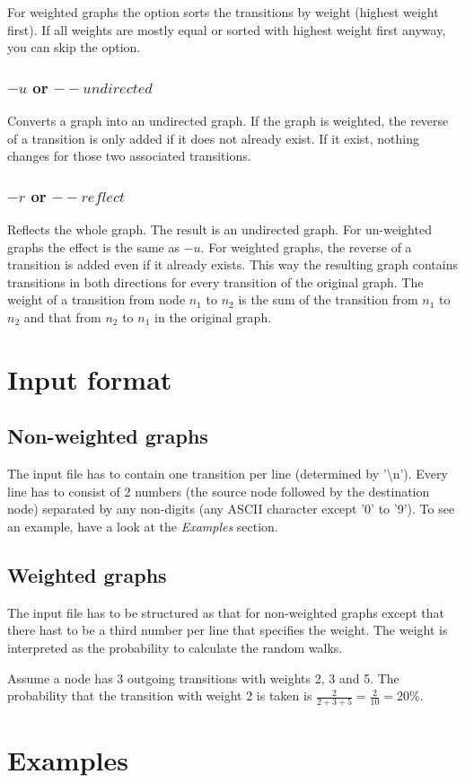 \documentclass[12pt,a4paper]{article}
\begin{document}
			For weighted graphs the option sorts the transitions by weight (highest weight first). If all weights are mostly equal or sorted with highest weight first anyway, you can skip the option.
		\subsubsection{$-u$ or $--undirected$}
			Converts a graph into an undirected graph. If the graph is weighted, the reverse of a transition is only added if it does not already exist. If it exist, nothing changes for those two associated transitions.
		\subsubsection{$-r$ or $--reflect$}
			Reflects the whole graph. The result is an undirected graph. For un-weighted graphs the effect is the same as $-u$. For weighted graphs, the reverse of a transition is added even if it already exists. This way the resulting graph contains transitions in both directions for every transition of the original graph. The weight of a transition from node $n_1$ to $n_2$ is the sum of the transition from $n_1$ to $n_2$ and that from $n_2$ to $n_1$ in the original graph.
\section{Input format}
	\subsection{Non-weighted graphs}
		The input file has to contain one transition per line (determined by '\textbackslash n'). Every line has to consist of 2 numbers (the source node followed by the destination node) separated by any non-digits (any ASCII character except '0' to '9'). To see an example, have a look at the \textit{Examples} section.
	\subsection{Weighted graphs}
		The input file has to be structured as that for non-weighted graphs except that there hast to be a third number per line that specifies the weight. The weight is interpreted as the probability to calculate the random walks.
		
		Assume a node has 3 outgoing transitions with weights 2, 3 and 5. The probability that the transition with weight 2 is taken is $\frac{2}{2+3+5}=\frac{2}{10}=20\%$.
\section{Examples}
\end{document}
